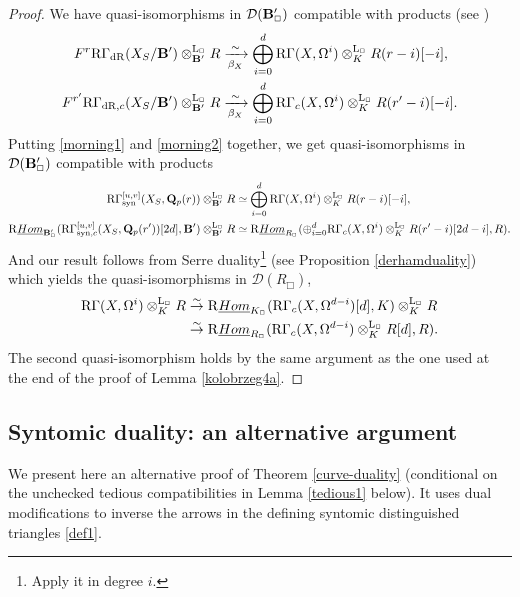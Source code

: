 \documentclass[10pt,reqno]{amsart}
\theoremstyle{definition}
\theoremstyle{remark}
\newcommand{\dr}{\operatorname{dR} }
\newcommand{\uHom}{\underline{{\rm{Hom}} }}
\newcommand{\synt}{ \operatorname{syn} }
\newcommand{\LL}{\operatorname{L} }
\newcommand{\sd}{{\mathcal{D}}}
\numberwithin{equation}{section}
\def\R{{\mathrm R}}
\def\Q{{\bf Q}} \def\Z{{\bf Z}}
\numberwithin{equation}{section}
\begin{document}
\begin{proof}
   We  have
quasi-isomorphisms in $\sd(\B^{\prime}_{\Box})$ compatible with products
 (see \cite[Prop.\,3.6, Prop.\,3.10]{AGN})
  \begin{align}\label{morning2}
 F^r\R\Gamma_{\dr}(X_S/\B^{\prime})\otimes^{\LL_{\Box}}_{\B^{\prime}} R & \xrightarrow[\beta_X]{\sim}  \bigoplus_{i=0}^{d}\R\Gamma(X,\Omega^i)\otimes^{\LL_{\Box}}_KR(r-i)[-i],\\
  F^{r^{\prime}}\R\Gamma_{\dr,c}(X_S/\B^{\prime})\otimes^{\LL_{\Box}}_{\B^{\prime}} R & \xrightarrow[\beta_X]{\sim} \bigoplus_{i=0}^{d}\R\Gamma_c(X,\Omega^i)\otimes^{\LL_{\Box}}_{K}R(r^{\prime}-i)[-i].\notag
 \end{align}
Putting \eqref{morning1} and \eqref{morning2} together, 
we get quasi-isomorphisms in $\sd(\B^{\prime}_{\Box})$ compatible with products
 \begin{align*}
 \R\Gamma^{{[u,v]}}_{\synt}(X_S,\Q_p(r))\otimes^{\LL_{\Box}}_{\B^{\prime}}R  & \simeq  \bigoplus_{i=0}^{d}\R\Gamma(X,\Omega^i) \otimes^{\LL_{\Box}}_KR(r-i)[-i],\\
  \R\uHom_{\B^{\prime}_{\Box}}(\R\Gamma^{{[u,v]}}_{\synt,c}(X_S,\Q_p(r^{\prime}))[2d],\B^{\prime})\otimes^{\LL_{\Box}}_{\B^{\prime}}R &
   \simeq \R\uHom_{R_{\Box}}( \oplus_{i=0}^{d}\R\Gamma_c(X,\Omega^i)\otimes^{\LL_{\Box}}_{K}R(r^{\prime}-i)[2d-i],R).
\end{align*}
And our result follows from Serre duality\footnote{Apply it in degree $i$.} (see Proposition  \ref{derhamduality}) which yields the quasi-isomorphisms in $\sd(R_{\Box})$,
\begin{align*}
\R\Gamma(X,\Omega^i) \otimes^{\LL_{\Box}}_KR & \stackrel{\sim}{\to} \R\uHom_{K_{\Box}}( \R\Gamma_c(X,\Omega^{d-i})[d],K)\otimes^{\LL_{\Box}}_{K}R\\
 & \stackrel{\sim}{\to} \R\uHom_{R_{\Box}}( \R\Gamma_c(X,\Omega^{d-i})\otimes^{\LL_{\Box}}_{K}R[d],R).
\end{align*}
The second quasi-isomorphism holds by the same argument as the one  used at the end of the proof of Lemma \ref{kolobrzeg4a}. 
 \end{proof}

 \subsection{Syntomic duality: an alternative argument} 
We present here an alternative proof of Theorem \ref{curve-duality} (conditional on the unchecked tedious compatibilities in Lemma \ref{tedious1} below). 
It uses dual modifications to inverse the arrows in the defining syntomic distinguished triangles \eqref{def1}. 
\end{document}
